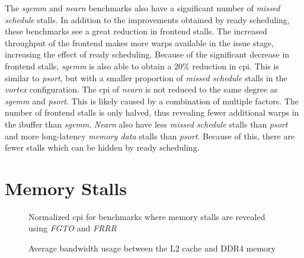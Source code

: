 The \textit{sgemm} and \textit{nearn} benchmarks also have a significant number of \textit{missed schedule} stalls. In addition to the improvements obtained by ready scheduling, these benchmarks see a great reduction in frontend stalls. The increased throughput of the frontend makes more warps available in the issue stage, increasing the effect of ready scheduling. Because of the significant decrease in frontend stalls, \textit{sgemm} is also able to obtain a $20\%$ reduction in \acrshort{cpi}. This is similar to \textit{psort}, but with a smaller proportion of \textit{missed schedule} stalls in the \textit{\Gls{vortex}} configuration. The \acrshort{cpi} of \textit{nearn} is not reduced to the same degree as \textit{sgemm} and \textit{psort}. This is likely caused by a combination of multiple factors. The number of frontend stalls is only halved, thus revealing fewer additional warps in the ibuffer than \textit{sgemm}. \textit{Nearn} also have less \textit{missed schedule} stalls than \textit{psort} and more long-latency \textit{memory data} stalls than \textit{psort}. Because of this, there are fewer stalls which can be hidden by ready scheduling.

\section{Memory Stalls} \label{sec:results_memory}

\begin{figure}
    \centering
    \caption[Normalized \acrshort{cpi} for benchmarks where memory stalls are revealed]{Normalized \acrshort{cpi} for benchmarks where memory stalls are revealed using \textit{FGTO} and \textit{FRRR}}
    \label{fig:exposed_memory}
\end{figure}

\begin{figure}
    \centering
    \caption[Average bandwidth usage between the L2 cache and main memory.]{Average bandwidth usage between the L2 cache and DDR4 memory}
    \label{fig:bandwidth_usage_l2}
\end{figure}

